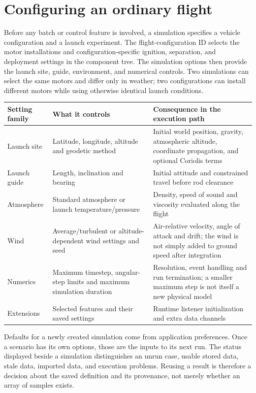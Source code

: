 \section{Configuring an ordinary flight}
Before any batch or control feature is involved, a simulation specifies a vehicle configuration and a launch experiment. The flight-configuration ID selects the motor installations and configuration-specific ignition, separation, and deployment settings in the component tree. The simulation options then provide the launch site, guide, environment, and numerical controls. Two simulations can select the same motors and differ only in weather; two configurations can install different motors while using otherwise identical launch conditions.

\begin{tabularx}{\linewidth}{@{}L{3.1cm}YY@{}}\toprule
Setting family & What it controls & Consequence in the execution path\\\midrule
Launch site & Latitude, longitude, altitude and geodetic method & Initial world position, gravity, atmospheric altitude, coordinate propagation, and optional Coriolis terms\\
Launch guide & Length, inclination and bearing & Initial attitude and constrained travel before rod clearance\\
Atmosphere & Standard atmosphere or launch temperature/pressure & Density, speed of sound and viscosity evaluated along the flight\\
Wind & Average/turbulent or altitude-dependent wind settings and seed & Air-relative velocity, angle of attack and drift; the wind is not simply added to ground speed after integration\\
Numerics & Maximum timestep, angular-step limits and maximum simulation duration & Resolution, event handling and run termination; a smaller maximum step is not itself a new physical model\\
Extensions & Selected features and their saved settings & Runtime listener initialization and extra data channels\\\bottomrule
\end{tabularx}

Defaults for a newly created simulation come from application preferences. Once a scenario has its own options, those are the inputs to its next run. The status displayed beside a simulation distinguishes an unrun case, usable stored data, stale data, imported data, and execution problems. Reusing a result is therefore a decision about the saved definition and its provenance, not merely whether an array of samples exists.

